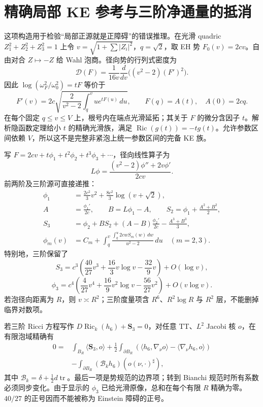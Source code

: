 \documentclass[UTF8,fontset=fandol,zihao=-4,oneside,openany]{ctexbook}
\theoremstyle{cjkplain}
\numberwithin{equation}{chapter}
\begin{document}
\section{精确局部 KE 参考与三阶净通量的抵消}
\label{GAU:local-KE}

这项构造用于检验“局部正源就是正障碍”的错误推理。在光滑 quadric
$Z_1^2+Z_2^2+Z_3^2=1$ 上令 $v=\sqrt{1+\sum|Z_i|^2}$，$q=\sqrt2$，取 EH 势 $F_0(v)=2cv$。自由对合 $Z\mapsto-Z$ 给 Wahl 泡商。径向势的行列式密度为
\begin{equation}\label{GAU:radial-determinant}
\mathcal D(F)=\frac1{16v}\frac d{dv}\bigl((v^2-2)(F')^2\bigr).
\end{equation}
因此 $\log(\omega_F^2/\omega_0^2)=tF$ 等价于
\begin{equation}\label{GAU:Volterra}
F'(v)=2c\sqrt{\frac2{v^2-2}\int_q^v u e^{tF(u)}\,du},
\qquad F(q)=A(t),\quad A(0)=2cq.
\end{equation}
在每个固定 $q\le v\le V$ 上，根号内在端点光滑延拓；其关于 $F$ 的微分含因子 $t$。解析隐函数定理给小 $t$ 的精确光滑族，满足
$\operatorname{Ric}(g(t))=-t g(t)$。允许参数区间依赖 $V$，所以这不是完整非紧泡上统一参数区间的完备 KE 族。

写 $F=2cv+t\phi_1+t^2\phi_2+t^3\phi_3+\cdots$，径向线性算子为
\[
L\phi=\frac{(v^2-2)\phi''+2v\phi'}{2cv}.
\]
前两阶及三阶源可直接递推：
\begin{align}
\phi_1&=\frac{2c^2}{3}v^2+\frac{8c^2}{3}\log(v+\sqrt2),\label{GAU:phi1}\\
A&=\frac{\phi_1'}{2c},\qquad B=L\phi_1-A,\qquad
S_2=\phi_1+\frac{A^2+B^2}{2},\nonumber\\
S_3&=\phi_2+B S_2+(A-B)\frac{\phi_2'}{2c}-\frac{A^3+B^3}{3},\label{GAU:S3}\\
\phi_m(v)&=C_m+\int_q^v\frac{\int_q^u2cw S_m(w)\,dw}{u^2-2}\,du\quad(m=2,3).\nonumber
\end{align}
特别地，三阶保留了
\[
S_3=c^3\left(\frac{40}{27}v^3+\frac{16}{3}v\log v-\frac{32}{9}v\right)+O(\log v),
\]
\begin{equation}\label{GAU:phi3}
\phi_3=c^4\left(\frac4{27}v^4+\frac{16}{9}v^2\log v-\frac{56}{27}v^2\right)+O(v\log v).
\end{equation}
若泡径向距离为 $R$，则 $v\asymp R^2$；三阶度量项含 $R^6$、$R^2\log R$ 与 $R^2$ 层，不能删掉临界对数项。

若三阶 Ricci 方程写作 $D\operatorname{Ric}_k(h_6)+\mathbf S_3=0$，对任意 TT、$L^2$ Jacobi 核 $o$，在有限泡域精确有
\begin{align}\label{GAU:net-flux}
0={}&\int_{B_R}\langle\mathbf S_3,o\rangle
+\frac12\int_{\partial B_R}
(\langle h_6,\nabla_\nu o\rangle-\langle\nabla_\nu h_6,o\rangle)\\
&-\int_{\partial B_R}(\mathcal B_k h_6)(o(\nu,\cdot)^\sharp),\nonumber
\end{align}
其中 $\mathcal B_k=\delta+\frac12d\operatorname{tr}$。最后一项是势规范的边界项；转到 Bianchi 规范时所有系数必须同步变化。由于显示的 $\phi_3$ 已给光滑原像，总和在每个有限 $R$ 精确为零。$40/27$ 的正号因而不能被称为 Einstein 障碍的正号。
\end{document}
